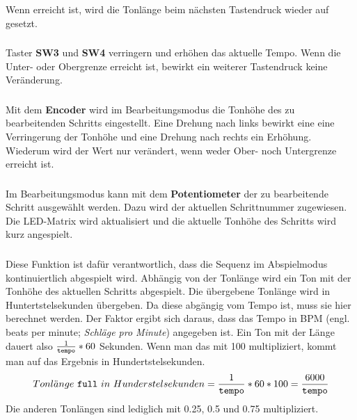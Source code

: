 \noindent Wenn  erreicht ist, wird die Tonlänge beim nächsten Tastendruck wieder auf  gesetzt.

\subsubsection{} %
\label{ssub:void_button_sw3_pressed}
Taster \textbf{SW3} und \textbf{SW4} verringern und erhöhen das aktuelle Tempo. Wenn die Unter- oder Obergrenze erreicht ist, bewirkt ein weiterer Tastendruck keine Veränderung.

\subsubsection{} %
\label{ssub:void_encoder_left&right}
Mit dem \textbf{Encoder} wird im Bearbeitungsmodus die Tonhöhe des zu bearbeitenden Schritts eingestellt. Eine Drehung nach links bewirkt eine eine Verringerung der Tonhöhe und eine Drehung nach rechts ein Erhöhung. Wiederum wird der Wert nur verändert, wenn weder Ober- noch Untergrenze erreicht ist.

\subsubsection{} %
\label{ssub:void_potentionmeter_turned}
Im Bearbeitungsmodus kann mit dem \textbf{Potentiometer} der zu bearbeitende Schritt ausgewählt werden. Dazu wird  der aktuellen Schrittnummer  zugewiesen. Die LED-Matrix wird aktualisiert und die aktuelle Tonhöhe des Schritts wird kurz angespielt.

\subsubsection{} %
\label{ssub:void_play_next_step}
Diese Funktion ist dafür verantwortlich, dass die Sequenz im Abspielmodus kontinuiertlich abgespielt wird. Abhängig von der Tonlänge wird ein Ton mit der Tonhöhe des aktuellen Schritts abgespielt. Die übergebene Tonlänge wird in Huntertstelsekunden übergeben. Da diese abgängig vom Tempo ist, muss sie hier berechnet werden. Der Faktor ergibt sich daraus, dass das Tempo in BPM (engl. beats per minute; \emph{Schläge pro Minute}) angegeben ist. Ein Ton mit der Länge  dauert also \(\frac{1}{\texttt{tempo}}*60\) Sekunden. Wenn man das mit 100 multipliziert, kommt man auf das Ergebnis in Hundertstelsekunden.
\[
Tonl\ddot{a}nge~\texttt{full}~in~Hunderstelsekunden=\frac{1}{\texttt{tempo}}*60*100=\frac{6000}{\texttt{tempo}}
\]
Die anderen Tonlängen sind lediglich mit 0.25, 0.5 und 0.75 multipliziert.\newline


